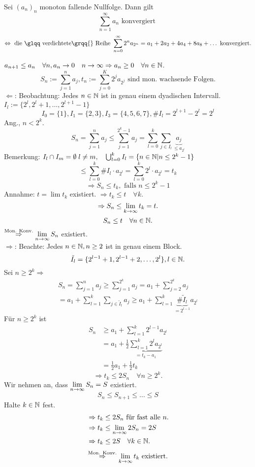 \begin{satz}
	Sei \((a_n)_n\) monoton fallende Nullfolge. Dann gilt
	\[\sum_{n=1}^{\infty} a_n \text{ konvergiert }\]
	\[\Leftrightarrow \text{ die \glqq verdichtete\grqq{} Reihe } \sum_{n=0}^{\infty}2^n a_{2^n} = a_1 + 2a_2 + 4a_4 + 8 a_8 + \dots \text{ konvergiert}.\]
\end{satz}
\begin{bew}
	\( a_{n+1} \leq a_n \quad\forall n, a_n\rightarrow0 \quad n \rightarrow\infty \Rightarrow a_n \geq 0 \quad\forall n\in\mathbb{N} \).
	\[ S_n := \sum_{j=1}^{n}a_j, t_n := \sum_{j=0}^{K}2^j a_{2^j} \text{ sind mon. wachsende Folgen.} \]
	\glqq\(\Leftarrow\)\grqq{}: Beobachtung: Jedes \(n\in\mathbb{N}\) ist in genau einem \glqq dyadischen\grqq{} Intervall. \( I_l := \{ 2^l, 2^l + 1, \dots, 2^{l+1} - 1 \} \)
	\[ I_0 = \{1\}, I_1 = \{2,3\}, I_3 = \{4,5,6,7\}, \#I_l = 2^{l+1} - 2^l = 2^l \]
	Ang., \(n<2^k\). 
	\[ S_n = \sum_{j=1}^{n}a_j \leq \sum_{j=1}^{2^k - 1}a_j = \sum_{l=0}^{k}\sum_{j\in I_l} \underbrace{a_j}_{\leq a_{2^l}} \]
	Bemerkung: \(I_l \cap I_m = \emptyset \; l \neq m, \quad \bigcup_{l=0}^{k} I_l = \{n \in \mathbb{N} | n \leq 2^k -1\}\)
	\[\leq \sum_{l=0}^{k} \#I_l \cdot a_{2^l} = \sum_{l=0}^{k} 2^l \cdot a_{2^l} = t_k\]
	\[ \Rightarrow S_n \leq t_k, \text{ falls } n\leq 2^k - 1 \]
	Annahme: \( t = \lim t_k \) existiert. \( \Rightarrow t_k \leq t \quad\forall k \).
	\[ \Rightarrow S_n \leq \lim\limits_{k\rightarrow\infty}t_k = t. \]
	\[S_n \leq t \quad\forall n\in\mathbb{N}.\]
	\( \overset{\text{Mon. Konv.}}{\Rightarrow} \lim\limits_{n\rightarrow\infty} S_n \) existiert. \checkmark\\
	\glqq\( \Rightarrow \)\grqq{}: Beachte: Jedes \(n \in\mathbb{N}, n\geq 2 \) ist in genau einem Block.
	\[ \tilde{I}_l = \{ 2^{l-1} + 1, 2^{l-1} + 2, \dots, 2^l \}, l\in\mathbb{N}. \]
	Sei \(n \geq 2^k \Rightarrow\)
	\begin{align*}
		S_n = \sum_{j=1}^{n}a_j \geq \sum_{j=1}^{2^k}a_j = a_1 + \sum_{j=2}^{2^k} a_j\\
		= a_1 + \sum_{l=1}^{k}\sum_{j\in\tilde{I}_l} a_j \geq a_1 + \sum_{l=1}^{k} \underbrace{\# \tilde{I}_l}_{=2^{l-1}} a_{2^l}
	\end{align*}
	Für \(n \geq 2^k \) ist
	\begin{align*}
		S_n &\geq a_1 + \sum_{l=1}^{k} 2^{l-1}a_{2^l}\\
		&=a_1 + \frac{1}{2} \underbrace{ \sum_{l=1}^{k}2^l a_{2^l} }_{=t_k - a_1}\\
		&= \frac{1}{2}a_1 + \frac{1}{2}t_k
	\end{align*}
	\[ \Rightarrow t_k \leq 2S_n \quad\forall n\geq 2^k. \]
	Wir nehmen an, dass \( \lim\limits_{n\rightarrow\infty}S_n = S \) existiert.
	\[ S_n \leq S_{n+1} \leq \dots \leq S \]
	Halte \( k\in\mathbb{N} \) fest.
	\begin{align*}
		&\Rightarrow t_k \leq 2S_n \text{ für fast alle } n.\\
		&\Rightarrow t_k \leq \lim\limits_{n\rightarrow\infty} 2S_n = 2S\\
		&\Rightarrow t_k \leq 2S \quad\forall k\in\mathbb{N}.
	\end{align*}
	\[ \overset{\text{Mon. Konv.}}{\Rightarrow}\lim\limits_{k\rightarrow\infty}t_k \text{ existiert.} \]
\end{bew}
